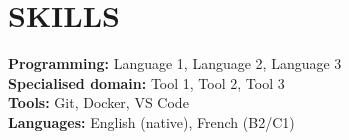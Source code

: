 \section{SKILLS}
\small{

\textbf{Programming:} Language 1, Language 2, Language 3 \\

\textbf{Specialised domain:} Tool 1, Tool 2, Tool 3 \\

\textbf{Tools:} Git, Docker, VS Code \\

\textbf{Languages:} English (native), French (B2/C1) \\

}
